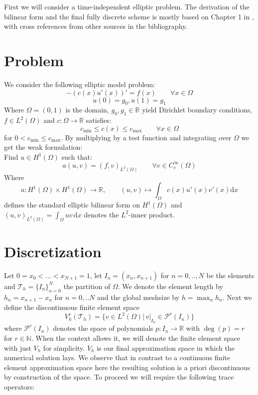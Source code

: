 First we will consider a time-independent elliptic problem. The derivation
of the bilinear form and the final fully discrete scheme is mostly based on
Chapter 1 in \cite{riviere2008}, with cross references from other sources 
in the bibliography.
\section{Problem}
We consider the following elliptic model problem:
\begin{equation}
    -(c(x)u'(x))' = f(x) \qquad \forall x\in \Omega
\end{equation} 
\begin{equation}
    u(0) = g_0, u(1) = g_1
\end{equation}
Where $\Omega = (0,1)$ is the domain, $g_0, g_1 \in \mathbb{R}$ yield
Dirichlet boundary conditions, $f \in L^2(\Omega)$ and $c:\Omega \to \mathbb{R}$
satisfies:
\[
    c_{\min} \leq c(x) \leq c_{\max} \qquad \forall x\in \Omega
\]
for $0 < c_{\min} \leq c_{\max}$.
By multiplying by a test function and integrating over $\Omega$ we get the 
weak formulation: \\
Find $u \in H^1(\Omega)$ such that:
\begin{equation}
    a(u,v) = (f,v)_{L^2(\Omega)} \qquad \forall v \in C_c^{\infty}(\Omega)
\end{equation}
Where 
\[
    a:H^1(\Omega) \times H^1(\Omega) \to \mathbb{R}, \qquad (u,v) \mapsto \int_{\Omega} c(x)u'(x)v'(x) \text{d}x
\]  
defines the standard elliptic bilinear form on $H^1(\Omega)$ and $(u,v)_{L^2(\Omega)} = \int_{\Omega} uv \,\text{d}x$
denotes the $L^2$-inner product.

\section{Discretization}
Let $0=x_0 < ... < x_{N+1} = 1$, let $I_n = (x_n, x_{n+1})$ for $n = 0,..,N$ be the elements and $\mathcal{T}_h = \{I_n\}_{n=0}^N$ the partition
of $\Omega$.
We denote the element length by $h_n = x_{n+1} - x_{n}$ for $n=0,..N$ and the global meshsize by
$h = \max_{n} h_n$.
Next we define the discontinuous finite element space
\begin{equation}
    V_h^r(\mathcal{T}_h) = \{v \in L^2(\Omega) |\, v|_{I_n} \in \mathcal{P}^r(I_n) \} 
\end{equation}
where $\mathcal{P}^r(I_n)$ denotes the space of polynomials $p:I_n \to \mathbb{R}$ with $\deg(p) = r$
for $r \in \mathbb{N}$. When the context allows it, we will denote the
finite element space with just $V_h$ for simplicity. 
$V_h$ is our final approximation space in which the numerical solution
lays.
We observe that in contrast to a continuous finite element approximation space 
here the resulting solution is a priori discontinuous by construction 
of the space. To proceed we will require the following trace operators:

